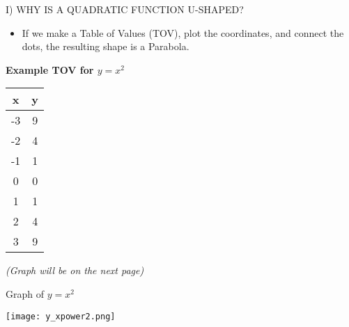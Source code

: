 \documentclass[aspectratio=169]{beamer}
\begin{document}
\begin{frame}{I) WHY IS A QUADRATIC FUNCTION U-SHAPED?}
    \begin{tcolorbox}[colback=lightgray,colframe=primary,title=Understanding the Parabola Shape]
        \footnotesize
        \begin{itemize}
            \item If we make a Table of Values (TOV), plot the coordinates, and connect the dots, the resulting shape is a Parabola.
        \end{itemize}
        
        \textbf{Example TOV for $y = x^2$}
        \begin{center}
        \begin{tabular}{|c|c|}
            \hline
            \textbf{x} & \textbf{y} \\
            \hline
            -3 & 9 \\
            -2 & 4 \\
            -1 & 1 \\
            0 & 0 \\
            1 & 1 \\
            2 & 4 \\
            3 & 9 \\
            \hline
        \end{tabular}
        \end{center}
        \vspace{0.5em}
        \textit{(Graph will be on the next page)}
    \end{tcolorbox}
\end{frame}

\begin{frame}{Graph of $y = x^2$}
    \begin{tcolorbox}[colback=lightgray,colframe=primary,title=Visual Representation]
        \centering
        \texttt{[image: y\_xpower2.png]}
    \end{tcolorbox}
\end{frame}
\end{document}
